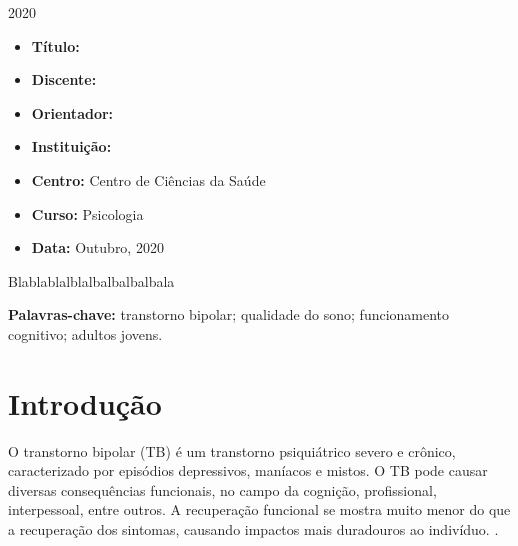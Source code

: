 \documentclass[chapter=TITLE,
               oneside,
               12pt,
               a4paper,
               english,
               brazil]{abntex2}    %
\renewcommand{\ABNTEXchapterfont}{\normalfont\fontseries{b}\selectfont}
\renewcommand{\imprimircapa}{%
    \begin{capa}%
        \center
        \ABNTEXchapterfont\Large\MakeUppercase\imprimirinstituicao

        \vspace*{1cm}

        {\ABNTEXchapterfont\Large\MakeUppercase\imprimirautor}

        \vfill
        \begin{center}
            \ABNTEXchapterfont\bfseries\LARGE\MakeUppercase\imprimirtitulo
        \end{center}
        \vfill

        \large\imprimirlocal

        \large{2020}

        \vspace*{1cm}
    \end{capa}
}
\begin{document}
\imprimircapa

\imprimirfolhaderosto

\label{sec:identificacao}

    \begin{itemize}

        \item \textbf{Título:} \imprimirtitulo

        \item \textbf{Discente:} \imprimirautor

        \item \textbf{Orientador:} \imprimirorientadorRotulo~\imprimirorientador

        \item \textbf{Instituição:} \imprimirinstituicao
            
        \item \textbf{Centro:} Centro de Ciências da Saúde

        \item \textbf{Curso:} Psicologia

        \item \textbf{Data:} Outubro, 2020

    \end{itemize}

\newpage
\begin{KeepFromToc}
\tableofcontents
\end{KeepFromToc}
\newpage

\begin{resumo}

    Blablablalblalbalbalbalbala

    \vspace{\onelineskip}

    \textbf{Palavras-chave:} transtorno bipolar; qualidade do sono;
    funcionamento cognitivo; adultos jovens.

\end{resumo}

\textual

\begingroup
\renewcommand{\cleardoublepage}{}
\renewcommand{\clearpage}{}

\chapter{Introdução}\label{sec:introducao}

    O transtorno bipolar (TB) é um transtorno psiquiátrico severo e crônico,
    caracterizado por episódios depressivos, maníacos e mistos.
    O TB pode causar diversas consequências funcionais, no campo da cognição,
    profissional, interpessoal, entre outros.
    A recuperação funcional se mostra muito menor do que a recuperação dos
    sintomas, causando impactos mais duradouros ao indivíduo.
    \parencite{american_psychiatric_association_diagnostic_2013}.
\end{document}
